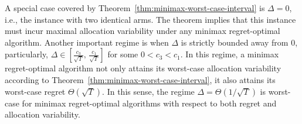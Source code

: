\documentclass[nonblindrev]{informs3_noinforms}
\begin{document}
{A special case covered by Theorem~\ref{thm:minimax-worst-case-interval} is $\Delta=0$, i.e., the instance with two identical arms. The theorem implies that this instance must incur maximal allocation variability under any minimax regret-optimal algorithm. Another important regime is when $\Delta$ is strictly bounded away from $0$, particularly, $\Delta \in \left[\frac{c_3}{\sqrt{T}},\,\frac{c_1}{\sqrt{T}}\right]$ for some $ 0<c_3<c_1.$ In this regime, a minimax regret-optimal algorithm not only attains its worst-case allocation variability according to Theorem~\ref{thm:minimax-worst-case-interval}, it also attains its worst-case regret $\Theta(\sqrt{T})$. In this sense, the regime $\Delta=\Theta(1/\sqrt{T})$ is worst-case for minimax regret-optimal algorithms with respect to both regret and allocation variability.
}
\end{document}
